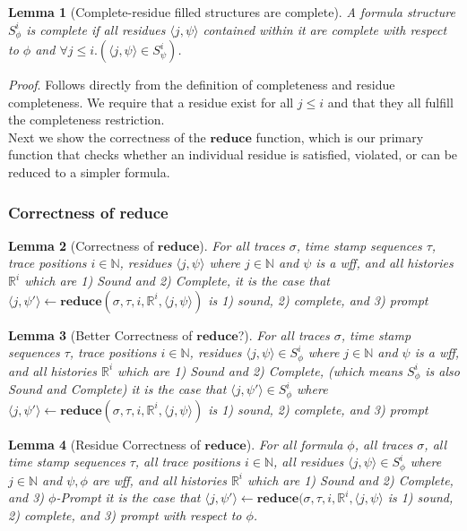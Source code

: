 \documentclass[10pt,a4paper]{article}
\newcommand{\rp}[2]{\ensuremath{\langle #1, #2 \rangle}}
\newtheorem{lemma}{Lemma}
\begin{document}
\begin{lemma}[Complete-residue filled structures are complete]
A formula structure $S^i_{\phi}$ is complete if all residues $\rp{j}{\psi}$ contained within it are complete with respect to $\phi$ and $\forall j \leq i.(\rp{j}{\psi} \in S^i_{\psi})$.
\end{lemma}

\noindent \emph{Proof}. Follows directly from the definition of completeness and residue completeness. We require that a residue exist for all $j \leq i$ and that they all fulfill the completeness restriction. \\

Next we show the correctness of the $\mathbf{reduce}$ function, which is our primary function that checks whether an individual residue is satisfied, violated, or can be reduced to a simpler formula.

\subsubsection{Correctness of reduce}
\begin{lemma}[Correctness of $\mathbf{reduce}$]
For all traces $\sigma$, time stamp sequences $\tau$, trace positions $i \in \mathbb{N}$, residues $\rp{j}{\psi}$ where $j \in \mathbb{N}$ and $\psi$ is a wff, and all histories $\mathbb{R}^i$ which are 1) Sound and 2) Complete,
%
it is the case that $\rp{j}{\psi'} \leftarrow \mathbf{reduce}(\sigma,\tau,i,\mathbb{R}^i, \rp{j}{\psi})$ is 1) sound, 2) complete, and 3) prompt
\end{lemma}

\begin{lemma}[Better Correctness of $\mathbf{reduce}$?]
For all traces $\sigma$, 
time stamp sequences $\tau$, 
trace positions $i \in \mathbb{N}$, 
residues $\rp{j}{\psi} \in S^i_{\phi}$ where $j \in \mathbb{N}$ and $\psi$ is a wff, 
and all histories $\mathbb{R}^i$ which are 1) Sound and 2) Complete, (which means $S^i_{\phi}$ is also Sound and Complete)
%
it is the case that $\rp{j}{\psi'} \in S^i_{\phi}$ where $ \rp{j}{\psi'} \leftarrow \mathbf{reduce}(\sigma,\tau,i,\mathbb{R}^i, \rp{j}{\psi})$ is 1) sound, 2) complete, and 3) prompt
\end{lemma}

\begin{lemma}[Residue Correctness of $\mathbf{reduce}$]
For all formula $\phi$,
all traces $\sigma$, 
all time stamp sequences $\tau$, 
all trace positions $i \in \mathbb{N}$, 
all residues $\rp{j}{\psi} \in S^i_{\phi}$ where $j \in \mathbb{N}$ and $\psi,\phi$ are wff, 
and all histories $\mathbb{R}^i$ which are 1) Sound and 2) Complete, and 3) $\phi$-Prompt 
%
it is the case that $\rp{j}{\psi'} \leftarrow \mathbf{reduce}(\sigma,\tau,i,\mathbb{R}^i, \rp{j}{\psi}$ is 1) sound, 2) complete, and 3) prompt with respect to $\phi$.
\end{lemma}
\end{document}
